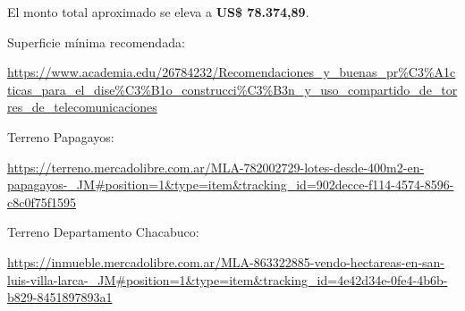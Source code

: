 El monto total aproximado se eleva a \textbf{US\$ 78.374,89}.







\newpage


\begin{thebibliography}{99}
Superficie mínima recomendada: \begin{tiny}
\url{https://www.academia.edu/26784232/Recomendaciones_y_buenas_pr\%C3\%A1cticas_para_el_dise\%C3\%B1o_construcci\%C3\%B3n_y_uso_compartido_de_torres_de_telecomunicaciones}
\end{tiny}

Terreno Papagayos: \begin{tiny}
\url{https://terreno.mercadolibre.com.ar/MLA-782002729-lotes-desde-400m2-en-papagayos-_JM#position=1&type=item&tracking_id=902decce-f114-4574-8596-c8c0f75f1595}
\end{tiny}



Terreno Departamento Chacabuco:  \begin{tiny}
\url{https://inmueble.mercadolibre.com.ar/MLA-863322885-vendo-hectareas-en-san-luis-villa-larca-_JM#position=1&type=item&tracking_id=4e42d34e-0fe4-4b6b-b829-8451897893a1}
\end{tiny}



\end{thebibliography}
